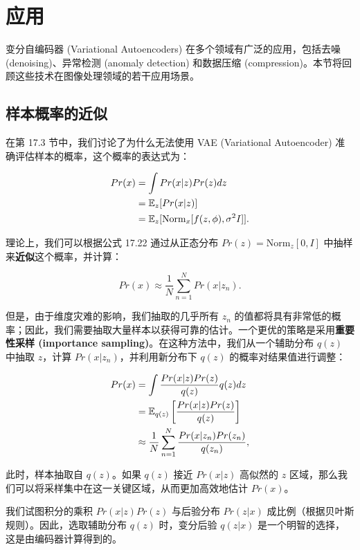 \section{应用}
变分自编码器 (Variational Autoencoders) 在多个领域有广泛的应用，包括去噪 (denoising)、异常检测 (anomaly detection) 和数据压缩 (compression)。本节将回顾这些技术在图像处理领域的若干应用场景。

\subsection{样本概率的近似}
在第 17.3 节中，我们讨论了为什么无法使用 VAE (Variational Autoencoder) 准确评估样本的概率，这个概率的表达式为：


\begin{align}
Pr(x) &= \int Pr(x|z)Pr(z)dz \notag \\
&= \mathbb{E}_{z} [Pr(x|z)] \notag \\
&= \mathbb{E}_{z} [\text{Norm}_x[f(z, \phi), \sigma^2 I]]. 
\end{align}


理论上，我们可以根据公式 17.22 通过从正态分布 \(Pr(z) = \text{Norm}_z[0,I]\) 中抽样来\textbf{近似}这个概率，并计算：

\begin{equation}
Pr(x) \approx \frac{1}{N} \sum_{n=1}^{N} Pr(x|z_n). 
\end{equation}

但是，由于维度灾难的影响，我们抽取的几乎所有 \(z_n\) 的值都将具有非常低的概率；因此，我们需要抽取大量样本以获得可靠的估计。一个更优的策略是采用\textbf{重要性采样 (importance sampling)}。在这种方法中，我们从一个辅助分布 \(q(z)\) 中抽取 \(z\)，计算 \(Pr(x|z_n)\)，并利用新分布下 \(q(z)\) 的概率对结果值进行调整：


\begin{align}
Pr(x) &= \int \frac{Pr(x|z)Pr(z)}{q(z)}q(z)dz \notag \\
&= \mathbb{E}_{q(z)} \left[\frac{Pr(x|z)Pr(z)}{q(z)}\right] \notag \\
&\approx \frac{1}{N} \sum_{n=1}^{N} \frac{Pr(x|z_n)Pr(z_n)}{q(z_n)}, 
\end{align} 


此时，样本抽取自 \(q(z)\)。如果 \(q(z)\) 接近 \(Pr(x|z)\) 高似然的 \(z\) 区域，那么我们可以将采样集中在这一关键区域，从而更加高效地估计 \(Pr(x)\)。

我们试图积分的乘积 \(Pr(x|z)Pr(z)\) 与后验分布 \(Pr(z|x)\) 成比例（根据贝叶斯规则）。因此，选取辅助分布 \(q(z)\) 时，变分后验 \(q(z|x)\) 是一个明智的选择，这是由编码器计算得到的。

